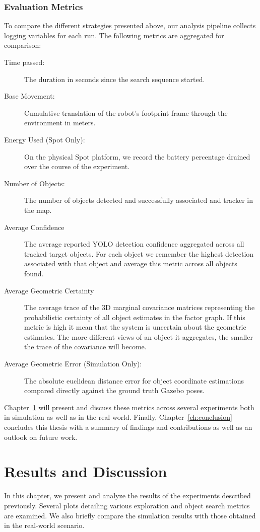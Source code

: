 \documentclass[
	parspace, %
	noindent, %
	final, %
]{elteikthesis}
\begin{document}
\subsection{Evaluation Metrics}
To compare the different strategies presented above, our analysis pipeline collects logging variables for each run. The following metrics are aggregated for comparison:

\begin{description}
    \item[Time passed:] The duration in seconds since the search sequence started.
    \item[Base Movement:] Cumulative translation of the robot's footprint frame through the environment in meters.
    \item[Energy Used (Spot Only):] On the physical Spot platform, we record the battery percentage drained over the course of the experiment.
    \item[Number of Objects:] The number of objects detected and successfully associated and tracker in the map.
    \item[Average Confidence] The average reported YOLO detection confidence aggregated across all tracked target objects. For each object we remember the highest detection associated with that object and average this metric across all objects found.
    \item[Average Geometric Certainty] The average trace of the 3D marginal covariance matrices representing the probabilistic certainty of all object estimates in the factor graph. If this metric is high it mean that the system is uncertain about the geometric estimates. The more different views of an object it aggregates, the smaller the trace of the covariance will become.
    \item[Average Geometric Error (Simulation Only):] The absolute euclidean distance error for object coordinate estimations compared directly against the ground truth Gazebo poses.
\end{description}

Chapter~\ref{ch:results} will present and discuss these metrics across several experiments both in simulation as well as in the real world. Finally, Chapter~\ref{ch:conclusion} concludes this thesis with a summary of findings and contributions as well as an outlook on future work.

\chapter{Results and Discussion}
\label{ch:results}
In this chapter, we present and analyze the results of the experiments described previously. Several plots detailing various exploration and object search metrics are examined. We also briefly compare the simulation results with those obtained in the real-world scenario.
\end{document}
